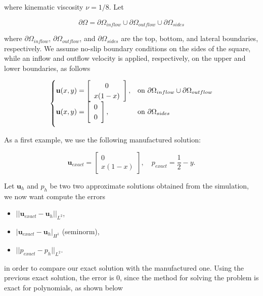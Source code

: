 \documentclass[11pt,a4paper,titlepage]{report}
\begin{document}
where kinematic viscosity $\nu = 1/8$. Let

\[
\partial \Omega = \partial \Omega_{inflow} \cup \partial \Omega_{outflow} \cup \partial \Omega_{sides}
\]

where $\partial \Omega_{inflow}$, $\partial \Omega_{outflow}$, and $\partial \Omega_{sides}$ are the top, bottom, and lateral boundaries, respectively. We assume no-slip boundary conditions on the sides of the square, while an inflow and outflow velocity is applied, respectively, on the upper and lower boundaries, as follows

\[
\begin{cases}
\mathbf{u}(x,y) = \left[ \begin{array}{c} 0 \\ x(1-x) \end{array} \right] , & \mbox{on } \partial \Omega_{inflow} \cup \partial \Omega_{outflow} \\

\vspace{.2cm}

\mathbf{u}(x,y) = \left[ \begin{array}{c} 0 \\ 0 \end{array} \right], & \mbox{on } \partial \Omega_{sides}
\end{cases}
\]

As a first example, we use the following manufactured solution:

\[
\mathbf{u}_{exact} = \left[ \begin{array}{c} 0 \\ x(1-x) \end{array} \right], \quad
p_{exact} = \frac{1}{2}-y.
\]

Let $\mathbf{u}_h$ and $p_h$ be two two approximate solutions obtained from the simulation, we now want compute the errors

\begin{itemize}
\item $|| \mathbf{u}_{exact} - \mathbf{u}_h ||_{L^2}$,
\item $ | \mathbf{u}_{exact} - \mathbf{u}_h |_{H^1}$ (seminorm),
\item $|| p_{exact} - p_h ||_{L^2} $.
\end{itemize}

in order to compare our exact solution with the manufactured one.
Using the previous exact solution, the error is 0, since the method for solving the problem is exact for polynomials, as shown below
\end{document}
